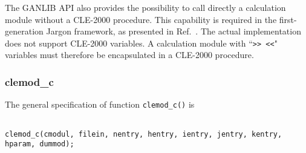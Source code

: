The GANLIB API also provides the possibility to call directly a calculation module without a CLE-2000 procedure. This
capability is required in the first-generation Jargon framework, as presented in Ref.~. The actual implementation
does not support CLE-2000 variables. A calculation module with ``{\tt >>~<<}" variables must therefore be encapsulated in a
CLE-2000 procedure.

\subsubsection{clemod\_c}

The general specification of function {\tt clemod\_c()} is

\begin{verbatim}

clemod_c(cmodul, filein, nentry, hentry, ientry, jentry, kentry, hparam, dummod);    
\end{verbatim}

\vskip 0.8cm

